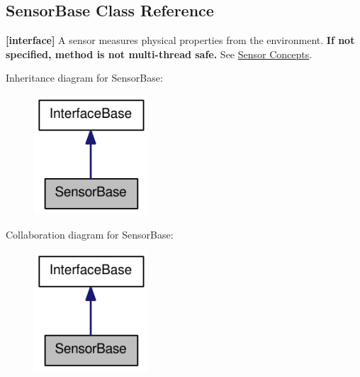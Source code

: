 \hypertarget{classOpenRAVE_1_1SensorBase}{
\subsection{SensorBase Class Reference}
\label{classOpenRAVE_1_1SensorBase}
}


{\bfseries \mbox{[}interface\mbox{]}} A sensor measures physical properties from the environment. {\bfseries If not specified, method is not multi-\/thread safe.} See \hyperlink{arch__sensor}{Sensor Concepts}.  




Inheritance diagram for SensorBase:\nopagebreak
\begin{figure}[H]
\begin{center}
\leavevmode
\includegraphics[width=120pt]{classOpenRAVE_1_1SensorBase__inherit__graph}
\end{center}
\end{figure}


Collaboration diagram for SensorBase:\nopagebreak
\begin{figure}[H]
\begin{center}
\leavevmode
\includegraphics[width=120pt]{classOpenRAVE_1_1SensorBase__coll__graph}
\end{center}
\end{figure}
